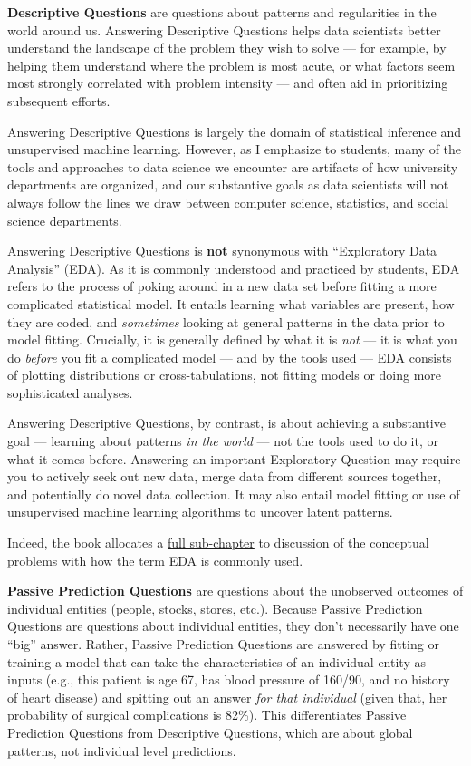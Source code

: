 \documentclass[12pt]{article}
\begin{document}
\textbf{Descriptive Questions} are questions about patterns and
regularities in the world around us. Answering Descriptive Questions
helps data scientists better understand the landscape of the problem
they wish to solve --- for example, by helping them understand where the
problem is most acute, or what factors seem most strongly correlated
with problem intensity --- and often aid in prioritizing subsequent
efforts.

Answering Descriptive Questions is largely the domain of statistical
inference and unsupervised machine learning. However, as I emphasize to
students, many of the tools and approaches to data science we encounter
are artifacts of how university departments are organized, and our
substantive goals as data scientists will not always follow the lines we
draw between computer science, statistics, and social science
departments.

Answering Descriptive Questions is \textbf{not} synonymous with
``Exploratory Data Analysis'' (EDA). As it is commonly understood and
practiced by students, EDA refers to the process of poking around in a
new data set before fitting a more complicated statistical model. It
entails learning what variables are present, how they are coded, and
\emph{sometimes} looking at general patterns in the data prior to model
fitting. Crucially, it is generally defined by what it is \emph{not} ---
it is what you do \emph{before} you fit a complicated model --- and by
the tools used --- EDA consists of plotting distributions or
cross-tabulations, not fitting models or doing more sophisticated
analyses.

Answering Descriptive Questions, by contrast, is about achieving a
substantive goal --- learning about patterns \emph{in the world} --- not
the tools used to do it, or what it comes before. Answering an important
Exploratory Question may require you to actively seek out new data,
merge data from different sources together, and potentially do novel
data collection. It may also entail model fitting or use of unsupervised
machine learning algorithms to uncover latent patterns.

Indeed, the book allocates a
\href{https://ds4humans.com/30_questions/07_eda.html}{full sub-chapter}
to discussion of the conceptual problems with how the term EDA is
commonly used.

\textbf{Passive Prediction Questions} are questions about the unobserved
outcomes of individual entities (people, stocks, stores, etc.). Because
Passive Prediction Questions are questions about individual entities,
they don't necessarily have one ``big'' answer. Rather, Passive
Prediction Questions are answered by fitting or training a model that
can take the characteristics of an individual entity as inputs (e.g.,
this patient is age 67, has blood pressure of 160/90, and no history of
heart disease) and spitting out an answer \emph{for that individual}
(given that, her probability of surgical complications is 82\%). This
differentiates Passive Prediction Questions from Descriptive Questions,
which are about global patterns, not individual level predictions.
\end{document}
